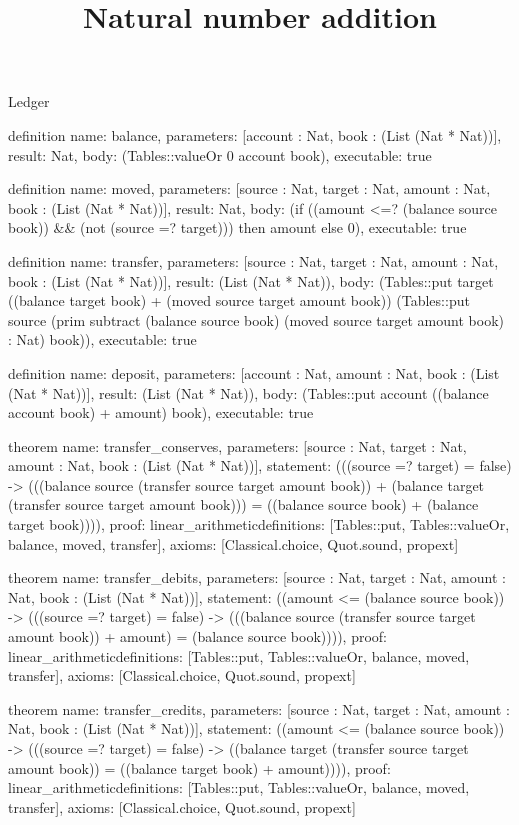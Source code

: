 \begin{lexlean}{Ledger}
\title{Natural number addition}
\begin{semanticmodule}
definition{
  name: balance,
  parameters: [account : Nat, book : (List (Nat * Nat))],
  result: Nat,
  body: (Tables::valueOr 0 account book),
  executable: true
}

definition{
  name: moved,
  parameters: [source : Nat, target : Nat, amount : Nat, book : (List (Nat * Nat))],
  result: Nat,
  body: (if ((amount <=? (balance source book)) && (not (source =? target))) then amount else 0),
  executable: true
}

definition{
  name: transfer,
  parameters: [source : Nat, target : Nat, amount : Nat, book : (List (Nat * Nat))],
  result: (List (Nat * Nat)),
  body: (Tables::put target ((balance target book) + (moved source target amount book)) (Tables::put source (prim subtract (balance source book) (moved source target amount book) : Nat) book)),
  executable: true
}

definition{
  name: deposit,
  parameters: [account : Nat, amount : Nat, book : (List (Nat * Nat))],
  result: (List (Nat * Nat)),
  body: (Tables::put account ((balance account book) + amount) book),
  executable: true
}

theorem{
  name: transfer_conserves,
  parameters: [source : Nat, target : Nat, amount : Nat, book : (List (Nat * Nat))],
  statement: (((source =? target) = false) -> (((balance source (transfer source target amount book)) + (balance target (transfer source target amount book))) = ((balance source book) + (balance target book)))),
  proof: linear_arithmetic{definitions: [Tables::put, Tables::valueOr, balance, moved, transfer]},
  axioms: [Classical.choice, Quot.sound, propext]
}

theorem{
  name: transfer_debits,
  parameters: [source : Nat, target : Nat, amount : Nat, book : (List (Nat * Nat))],
  statement: ((amount <= (balance source book)) -> (((source =? target) = false) -> (((balance source (transfer source target amount book)) + amount) = (balance source book)))),
  proof: linear_arithmetic{definitions: [Tables::put, Tables::valueOr, balance, moved, transfer]},
  axioms: [Classical.choice, Quot.sound, propext]
}

theorem{
  name: transfer_credits,
  parameters: [source : Nat, target : Nat, amount : Nat, book : (List (Nat * Nat))],
  statement: ((amount <= (balance source book)) -> (((source =? target) = false) -> ((balance target (transfer source target amount book)) = ((balance target book) + amount)))),
  proof: linear_arithmetic{definitions: [Tables::put, Tables::valueOr, balance, moved, transfer]},
  axioms: [Classical.choice, Quot.sound, propext]
}


\end{semanticmodule}
\end{lexlean}

